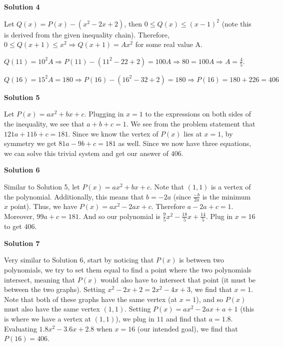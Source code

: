 \begin{enumerate}
 



\textbf{Solution 4}

Let $Q(x) = P(x) - (x^2-2x+2)$, then $0\le Q(x) \le (x-1)^2$ (note this is derived from the given inequality chain).  Therefore, $0\le Q(x+1) \le x^2 \Rightarrow Q(x+1) = Ax^2$ for some real value A.

 $Q(11) = 10^2A \Rightarrow P(11)-(11^2-22+2)=100A \Rightarrow 80=100A \Rightarrow A=\frac{4}{5}$.

 $Q(16)=15^2A=180 \Rightarrow P(16)-(16^2-32+2) = 180 \Rightarrow P(16)=180+226= \boxed{406}$




\textbf{Solution 5}

Let $P(x) = ax^2 + bx + c$. Plugging in $x = 1$ to the expressions on both sides of the inequality, we see that $a + b + c = 1$. We see from the problem statement that $121a + 11b + c = 181$. Since we know the vertex of $P(x)$ lies at $x = 1$, by symmetry we get $81a -9b + c = 181$ as well. Since we now have three equations, we can solve this trivial system and get our answer of $\boxed{406}$.

 



\textbf{Solution 6}

Similar to Solution 5, let $P(x) = ax^2 + bx + c$. Note that $(1,1)$ is a vertex of the polynomial. Additionally, this means that $b = -2a$ (since $\frac{-b}{2a}$ is the minimum $x$ point). Thus, we have $P(x) = ax^2 - 2ax + c$. Therefore $a - 2a + c = 1$. Moreover, $99a + c = 181$. And so our polynomial is $\frac{9}{5}x^2 - \frac{18}{5}x + \frac{14}{5}$. Plug in $x = 16$ to get $\boxed{406}$.

 



\textbf{Solution 7}

Very similar to Solution 6, start by noticing that $P(x)$ is between two polynomials, we try to set them equal to find a point where the two polynomials intersect, meaning that $P(x)$ would also have to intersect that point (it must be between the two graphs). Setting $x^2 - 2x + 2 = 2x^2 - 4x + 3$, we find that $x = 1$. Note that both of these graphs have the same vertex (at $x = 1$), and so $P(x)$ must also have the same vertex $(1, 1)$. Setting $P(x) = ax^2 - 2ax + a + 1$ (this is where we have a vertex at $(1, 1)$), we plug in $11$ and find that $a = 1.8$. Evaluating $1.8x^2 - 3.6x + 2.8$ when $x = 16$ (our intended goal), we find that $P(16) = \boxed{406}$.


\end{enumerate}
